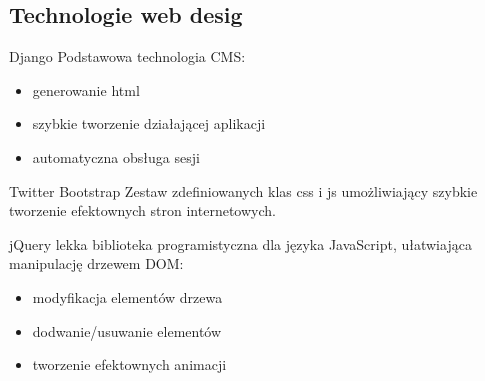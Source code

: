\documentclass{beamer}
\begin{document}
\subsection{Technologie web desig}
  \begin{frame}
    \begin{block}{Django}
      Podstawowa technologia CMS:
      \begin{itemize}
        \item generowanie html
        \item szybkie tworzenie działającej aplikacji
        \item automatyczna obsługa sesji
      \end{itemize}
    \end{block}
  \end{frame}
  \begin{frame}
    \begin{block}{Twitter Bootstrap}
      Zestaw zdefiniowanych klas css i js umożliwiający szybkie tworzenie efektownych stron internetowych.
    \end{block}
  \end{frame}
  \begin{frame}
    \begin{block}{jQuery}
      lekka biblioteka programistyczna dla języka JavaScript, ułatwiająca manipulację drzewem DOM:
      \begin{itemize}
        \item modyfikacja elementów drzewa
        \item dodwanie/usuwanie elementów
        \item tworzenie efektownych animacji
      \end{itemize}
    \end{block}
  \end{frame}
\end{document}

